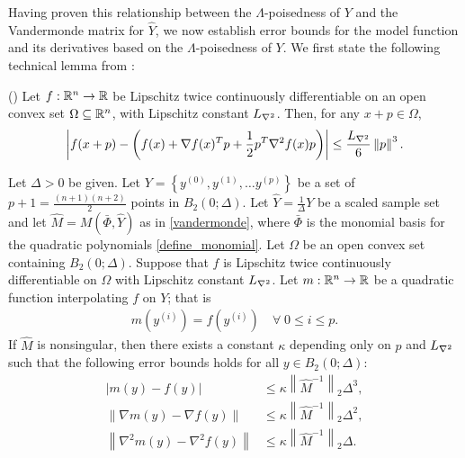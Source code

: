 \documentclass{article}
\newcommand{\real}{\mathbb R}
\begin{document}
Having proven this relationship between the $\Lambda$-poisedness of $Y$ and the Vandermonde matrix for $\hat{Y}$,  we now establish error bounds for the model function and its derivatives based on the $\Lambda$-poisedness of $Y$.   We first state the following technical lemma from \cite{dennisschnabel1983}:
\begin{lemma}(\cite[Lemma 4.1.14]{dennisschnabel1983})
\label{4_1_14}
Let $f : \mathbb R^n \to \mathbb R$ be Lipschitz twice continuously differentiable on an open convex set $\Omega \subseteq \mathbb R^n$,
with Lipschitz constant ${L_{\nabla^2}}$.
Then, for any $x + p\in \Omega$,
\begin{align*}
\left|f(x + p) - \left(f(x) + \nabla f(x)^T p + \frac 1 2 p^T \nabla^2 f(x)p\right) \right|
\le \frac {{L_{\nabla^2}}} 6 \left\|p\right\|^3.
\end{align*}
\end{lemma}
\begin{theorem}
\label{3_16_replacement2}
Let  $\Delta>0$  be given.
Let $Y = \left\{y^{(0)}, y^{(1)}, \ldots y^{(p)} \right\}$ be a set of $p+1=\frac{(n+1)(n+2)}{2}$ points in $B_2\left(0;\Delta\right)$.
Let  $\hat{Y}=\frac{1}{\Delta} Y$ be a scaled sample set and let $\hat{M} = M(\bar \Phi,\hat{Y})$ as in \cref{vandermonde},
where $\bar \Phi$ is the monomial basis for the quadratic polynomials \cref{define_monomial}.
Let $\Omega$ be an open convex set containing $B_2(0;\Delta)$.
Suppose that $f$ is Lipschitz twice continuously differentiable on $\Omega$ with Lipschitz constant ${L_{\nabla^2}}$.
Let $m: \Rn \rightarrow \real$ be a quadratic function interpolating $f$ on $Y$; that is 
\begin{align}
m\left(y^{(i)}\right) = f\left(y^{(i)}\right) \quad \forall \; 0 \le i \le p. \label{nce_interpolation_condition}
\end{align}
If $\hat{M}$ is nonsingular, then there exists a constant $\kappa$ depending only on $p$ and ${L_{\nabla^2}}$ such that the following error bounds holds for all $y \in B_2\left(0; \Delta\right)$:
\begin{align}
\left|m(y) - f(y)\right| &\le \kappa \left\|\hat M^{-1}\right\|_2 \Delta^3, \label{error_in_function}  \\
\left\|\nabla m(y) - \nabla f(y)\right\| &\le \kappa \left\|\hat M^{-1} \right\|_2\Delta^2, \label{error_in_gradient} \\
\left\|\nabla^2 m(y) - \nabla^2 f(y)\right\| &\le \kappa \left\|\hat M^{-1} \right\|_2\Delta. \label{error_in_hessian}
\end{align}
\end{theorem}
\end{document}
